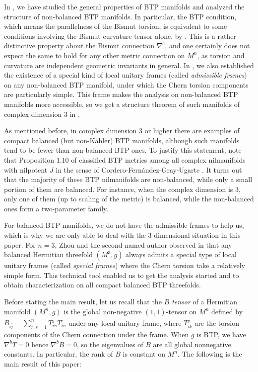 \documentclass{amsart}
\numberwithin{equation}{section}
\theoremstyle{definition}
\renewcommand{\1}{\mathds{1}}
\renewcommand{\>}{\rightarrow}
\begin{document}
In \cite{ZhaoZ24}, we have studied the general properties of BTP manifolds and analyzed the structure of non-balanced BTP manifolds. In particular, the BTP condition, which means the parallelness of the Bismut torsion, is equivalent to some conditions involving the Bismut curvature tensor alone, by \cite[Theorem 1.1]{ZhaoZ24}. This is a rather distinctive property about the Bismut connection $\nabla^b$, and one certainly does not expect the same to hold for any other metric connection on $M^n$,   as torsion and curvature are independent geometric invariants in general. In \cite[Proposition 1.7]{ZhaoZ24}, we also established the existence of a special kind of local unitary frames (called {\em admissible frames}) on any non-balanced BTP manifold, under which the Chern torsion components are particularly simple. This frame makes the analysis on non-balanced BTP manifolds more accessible, so we get a structure theorem of such manifolds of complex dimension $3$ in \cite[Theorem 1.16]{ZhaoZ24}.

As mentioned before, in complex dimension $3$ or higher there are examples of compact balanced (but non-K\"ahler) BTP manifolds, although such manifolds tend to be fewer than non-balanced BTP ones. To justify this statement,  note that Proposition 1.10 of \cite{ZhaoZ24} classified BTP metrics among all complex nilmanifolds with nilpotent $J$ in the sense of Cordero-Fern\'andez-Gray-Ugarte \cite{CFGU}. It turns out that the majority of these BTP nilmanifolds are non-balanced, while only a small portion of them are balanced. For instance, when the complex dimension is $3$, only one of them (up to scaling of the metric) is balanced, while the non-balanced ones form a two-parameter family.

For balanced BTP manifolds, we do not have the admissible frames to help us, which is why we are only able to deal with the $3$-dimensional situation in this paper. For $n=3$, Zhou and the second named author observed in \cite{ZhouZ} that any balanced Hermitian threefold $(M^3,g)$ always admits a special type of local unitary frames (called {\em special frames}) where the Chern torsion take a relatively simple form. This technical tool enabled us to get the analysis started and  to obtain characterization on all compact balanced BTP threefolds.

Before stating the main result, let us recall that the {\em $B$ tensor} of a Hermitian manifold $(M^n,g)$ is the global non-negative $(1,1)$-tensor on $M^n$ defined by $B_{i\bar{j}} = \sum_{r,s=1}^n T^j_{rs} \overline{T^i_{rs} }$ under any local unitary frame, where $T^j_{ik}$ are the torsion components of the Chern connection under the frame. When $g$ is BTP, we have $\nabla^bT=0$ hence $\nabla^bB=0$, so the eigenvalues of $B$ are all global nonnegative constants. In particular, the rank of $B$ is constant on $M^n$. The following is the main result of this paper:
\end{document}
